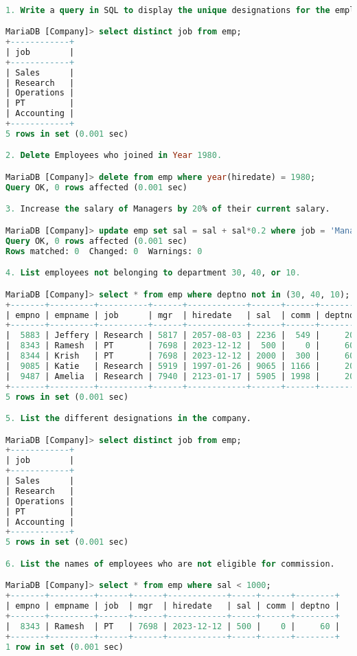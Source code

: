 \documentclass[11pt]{article}
\begin{document}
\begin{lstlisting}[language=SQL]

1. Write a query in SQL to display the unique designations for the employees.

MariaDB [Company]> select distinct job from emp;
+------------+
| job        |
+------------+
| Sales      |
| Research   |
| Operations |
| PT         |
| Accounting |
+------------+
5 rows in set (0.001 sec)

2. Delete Employees who joined in Year 1980.

MariaDB [Company]> delete from emp where year(hiredate) = 1980;
Query OK, 0 rows affected (0.001 sec)

3. Increase the salary of Managers by 20% of their current salary.

MariaDB [Company]> update emp set sal = sal + sal*0.2 where job = 'Manager';
Query OK, 0 rows affected (0.001 sec)
Rows matched: 0  Changed: 0  Warnings: 0

4. List employees not belonging to department 30, 40, or 10.

MariaDB [Company]> select * from emp where deptno not in (30, 40, 10);
+-------+---------+----------+------+------------+------+------+--------+
| empno | empname | job      | mgr  | hiredate   | sal  | comm | deptno |
+-------+---------+----------+------+------------+------+------+--------+
|  5883 | Jeffery | Research | 5817 | 2057-08-03 | 2236 |  549 |     20 |
|  8343 | Ramesh  | PT       | 7698 | 2023-12-12 |  500 |    0 |     60 |
|  8344 | Krish   | PT       | 7698 | 2023-12-12 | 2000 |  300 |     60 |
|  9085 | Katie   | Research | 5919 | 1997-01-26 | 9065 | 1166 |     20 |
|  9487 | Amelia  | Research | 7940 | 2123-01-17 | 5905 | 1998 |     20 |
+-------+---------+----------+------+------------+------+------+--------+
5 rows in set (0.001 sec)

5. List the different designations in the company.

MariaDB [Company]> select distinct job from emp;
+------------+
| job        |
+------------+
| Sales      |
| Research   |
| Operations |
| PT         |
| Accounting |
+------------+
5 rows in set (0.001 sec)

6. List the names of employees who are not eligible for commission.

MariaDB [Company]> select * from emp where sal < 1000;
+-------+---------+------+------+------------+-----+------+--------+
| empno | empname | job  | mgr  | hiredate   | sal | comm | deptno |
+-------+---------+------+------+------------+-----+------+--------+
|  8343 | Ramesh  | PT   | 7698 | 2023-12-12 | 500 |    0 |     60 |
+-------+---------+------+------+------------+-----+------+--------+
1 row in set (0.001 sec)


\end{lstlisting}
\end{document}
